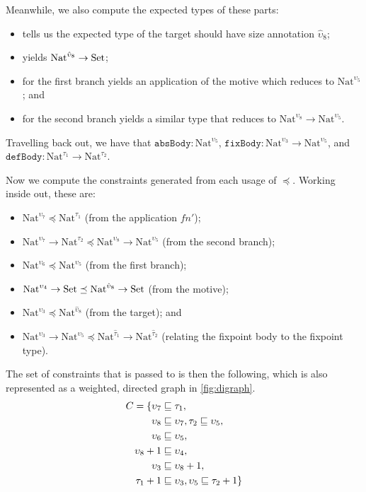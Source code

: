Meanwhile, we also compute the expected types of these parts:
\begin{itemize}
    \item \casesize tells us the expected type of the target should have size annotation $\hat{\upsilon}_8$;
    \item \motivetype yields $\text{Nat}^{\hat{\upsilon}_8} \to \text{Set}$;
    \item \branchtype for the first branch yields an application of the motive which reduces to $\text{Nat}^{\upsilon_5}$; and
    \item \branchtype for the second branch yields a similar type that reduces to $\text{Nat}^{\upsilon_8} \to \text{Nat}^{\upsilon_5}$.
\end{itemize}

Travelling back out, we have that $\texttt{absBody}: \text{Nat}^{\upsilon_5}$, $\texttt{fixBody}: \text{Nat}^{\upsilon_3} \to \text{Nat}^{\upsilon_5}$, and $\texttt{defBody}: \text{Nat}^{\tau_1} \to \text{Nat}^{\tau_2}$.

Now we compute the constraints generated from each usage of $\preceq$.
Working inside out, these are:
\begin{itemize}
    \item $\text{Nat}^{\upsilon_7} \preceq \text{Nat}^{\tau_1}$ (from the application $f n'$);
    \item $\text{Nat}^{\upsilon_7} \to \text{Nat}^{\tau_2} \preceq \text{Nat}^{\upsilon_8} \to \text{Nat}^{\upsilon_5}$ (from the second branch);
    \item $\text{Nat}^{\upsilon_6} \preceq \text{Nat}^{\upsilon_5}$ (from the first branch);
    \item $\text{Nat}^{\upsilon_4} \to \text{Set} \preceq \text{Nat}^{\hat{\upsilon}_8} \to \text{Set}$ (from the motive);
    \item $\text{Nat}^{\upsilon_3} \preceq \text{Nat}^{\hat{\upsilon}_8}$ (from the target); and
    \item $\text{Nat}^{\upsilon_3} \to \text{Nat}^{\upsilon_5} \preceq \text{Nat}^{\hat{\tau}_1} \to \text{Nat}^{\hat{\tau}_2}$ (relating the fixpoint body to the fixpoint type).
\end{itemize}

The set of constraints that is passed to \RecCheckLoop is then the following, which is also represented as a weighted, directed graph in \autoref{fig:digraph}.
\begin{align*}
    C = \{\upsilon_7 &\sqsubseteq \tau_1, \\
    \upsilon_8 &\sqsubseteq \upsilon_7, \tau_2 \sqsubseteq \upsilon_5, \\
    \upsilon_6 &\sqsubseteq \upsilon_5, \\
    \upsilon_8+1 &\sqsubseteq \upsilon_4, \\
    \upsilon_3 &\sqsubseteq \upsilon_8+1, \\
    \tau_1+1 &\sqsubseteq \upsilon_3, \upsilon_5 \sqsubseteq \tau_2+1\}
\end{align*}

